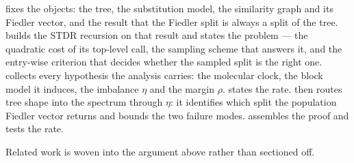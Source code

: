  fixes the objects: the tree, the substitution model, the similarity graph
and its Fiedler vector, and the result that the Fiedler split is always a split of the tree.
 builds the STDR recursion on that result and states the problem --- the
quadratic cost of its top-level call, the sampling scheme that answers it, and the entry-wise
criterion that decides whether the sampled split is the right one.  collects every hypothesis the
analysis carries: the molecular clock, the block model it induces, the imbalance $\eta$ and the
margin $\rho$.  states the rate.  then routes tree shape into
the spectrum through $\eta$: it identifies which split the population Fiedler vector returns and
bounds the two failure modes.  assembles the proof and 
tests the rate.

Related work is woven into the argument above rather than sectioned off.
